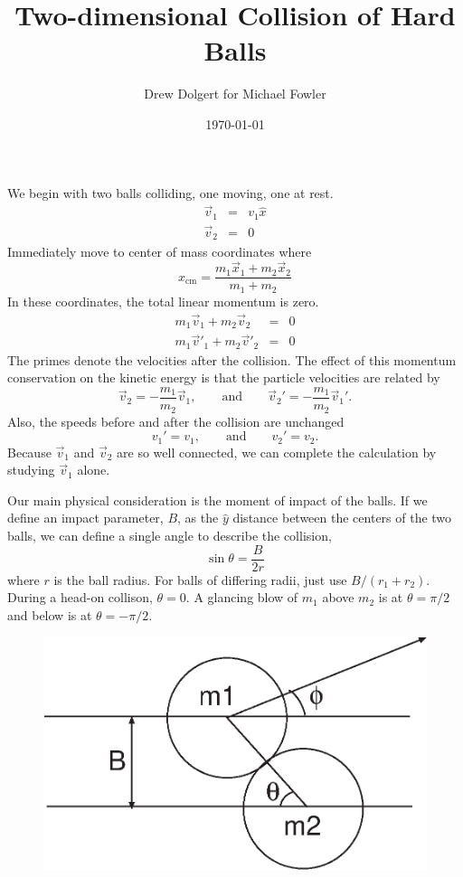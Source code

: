 \documentclass{article}
\newcommand{\vo}{\vec{v}_1}
\newcommand{\yh}{\hat{y}}
\begin{document}
\title{Two-dimensional Collision of Hard Balls}
\author{Drew Dolgert for Michael Fowler}
\date{\today}
\maketitle

We begin with two balls colliding, one moving, one at rest.
\begin{eqnarray}
\vo & = & v_1\hat{x} \\
\vec{v}_2 & = & 0
\end{eqnarray}
Immediately move to center of mass coordinates where
\begin{equation}
x_{\mbox{cm}}=\frac{m_1\vec{x}_1+m_2\vec{x}_2}{m_1+m_2}
\end{equation}
In these coordinates, the total linear momentum is zero.
\begin{eqnarray}
m_1\vec{v}_1+m_2\vec{v}_2 & = & 0 \\
m_1\vec{v}'_1+m_2\vec{v}'_2 & = & 0
\end{eqnarray}
The primes denote the velocities after the collision.
The effect of this momentum conservation on the kinetic energy
is that the particle velocities are related by
\begin{equation}
  \vec{v}_2 = -\frac{m_1}{m_2} \vec{v}_1,\qquad\mbox{and}\qquad
  \vec{v}_2'=-\frac{m_1}{m_2}\vec{v}_1'.
\end{equation}
Also, the speeds before and after the collision are unchanged
\begin{equation}
  v_1' = v_1,\qquad\mbox{and}\qquad v_2' = v_2.
\end{equation}
Because $\vec{v}_1$ and $\vec{v}_2$ are so well connected, we
can complete the calculation by studying $\vec{v}_1$ alone.

Our main physical consideration is the moment of impact of the
balls.  If we define an impact parameter, $B$, as the $\yh$
distance between the centers of the two balls, we can define
a single angle to describe the collision,
\begin{equation}
  \sin\theta = \frac{B}{2r}
\end{equation}
where $r$ is the ball radius.  For balls of differing radii, just use
$B/(r_1+r_2)$.  During a head-on collison, $\theta=0$.  A glancing blow
of $m_1$ above $m_2$ is at $\theta=\pi/2$ and below is at $\theta=-\pi/2$.
\begin{figure}
\centerline{\includegraphics{angles.eps}}
\end{figure}
\end{document}
